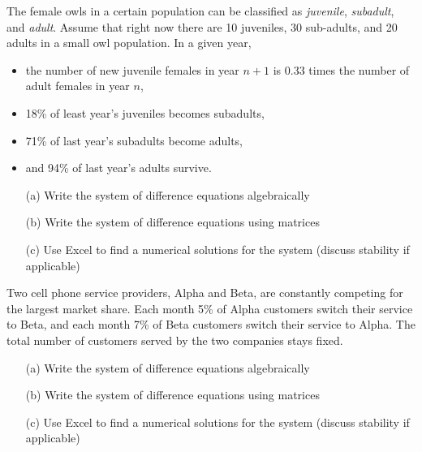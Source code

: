 \begin{problem}
The female owls in a certain population can be classified as {\it juvenile},
    {\it subadult}, and {\it adult}. Assume that right now there are 10 juveniles, 30
    sub-adults, and 20 adults in a small owl population.  In a given year, 
    \begin{itemize}
        \item the number of new juvenile females in year $n+1$ is 0.33 times the
            number of adult females in year $n$, 
        \item 18\% of least year's juveniles becomes subadults, 
        \item 71\% of last year's subadults become adults,
        \item and 94\% of last year's adults survive.
    \end{itemize}
\begin{itemize}
    \item[(a)] Write the system of difference equations algebraically
    \item[(b)]Write the system of difference equations using matrices
    \item[(c)] Use Excel to find a numerical solutions for the system (discuss stability if
        applicable)
\end{itemize}
\end{problem}

\begin{problem}
    Two cell phone service providers, Alpha and Beta, are constantly competing for the largest market
    share. Each month 5\% of Alpha customers switch their service to Beta, and each month
    7\% of Beta customers switch their service to Alpha. The total number of customers
    served by the two companies stays fixed. 
\begin{itemize}
    \item[(a)] Write the system of difference equations algebraically
    \item[(b)]Write the system of difference equations using matrices
    \item[(c)] Use Excel to find a numerical solutions for the system (discuss stability if
        applicable)
\end{itemize}
\end{problem}

